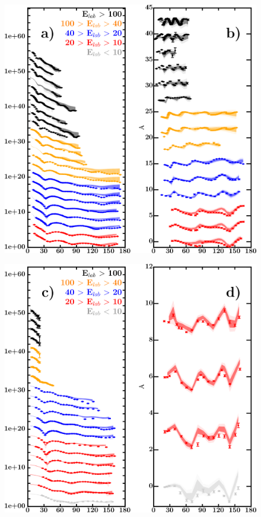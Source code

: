\documentclass[twocolumn,secnumarabic,amssymb, nobibnotes, aps, prl,
superscriptaddress, nobalancelastpage]{revtex4}
\begin{document}
\begin{figure}[!htb]
    \centering
    \begin{minipage}{0.4\linewidth}
        \centering
        \includegraphics[width=\linewidth]{figures/ca40_protonElastic.png}
        \label{DOM_ca40_proton_elastic}
    \end{minipage}\hspace{6pt}
    \begin{minipage}{0.4\linewidth}
        \centering
        \includegraphics[width=\linewidth]{figures/ca40_neutronElastic.png}

\end{minipage}
\end{figure}
\end{document}
